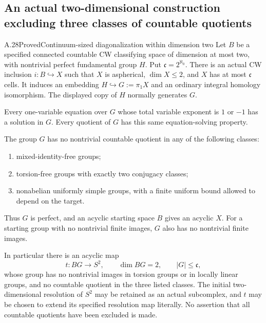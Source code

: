 \subsection{An actual two-dimensional construction excluding three classes of countable quotients}

\begin{claim}{A.28}{Proved}{Continuum-sized diagonalization within dimension two}
Let $B$ be a specified connected countable CW classifying
space of dimension at most two, with nontrivial perfect
fundamental group $H$. Put $\mathfrak c=2^{\aleph_0}$.
There is an actual CW inclusion $i:B\hookrightarrow X$
such that $X$ is aspherical, $\dim X\leq2$, and $X$ has
at most $\mathfrak c$ cells. It induces an embedding
$H\hookrightarrow G:=\pi_1X$ and an ordinary integral
homology isomorphism. The displayed copy of $H$ normally
generates $G$.

Every one-variable equation over $G$ whose total
variable exponent is $1$ or $-1$ has a solution
in $G$. Every quotient of $G$ has this same
equation-solving property.

The group $G$ has no nontrivial countable quotient in
any of the following classes:
\begin{enumerate}
\item mixed-identity-free groups;
\item torsion-free groups with exactly two conjugacy classes;
\item nonabelian uniformly simple groups, with a finite
uniform bound allowed to depend on the target.
\end{enumerate}
Thus $G$ is perfect, and an acyclic starting space $B$
gives an acyclic $X$. For a starting group with no
nontrivial finite images, $G$ also has no nontrivial
finite images.

In particular there is an acyclic map
\[
 t:BG\longrightarrow S^2,
 \qquad \dim BG=2,\qquad |G|\leq\mathfrak c,
 \tag{A.28.1}
\]
whose group has no nontrivial images in torsion groups
or in locally linear groups, and no
countable quotient in the three listed classes. The
initial two-dimensional resolution of $S^2$ may be
retained as an actual subcomplex, and $t$ may be chosen
to extend its specified resolution map literally.
No assertion that all countable quotients have been
excluded is made.
\end{claim}


